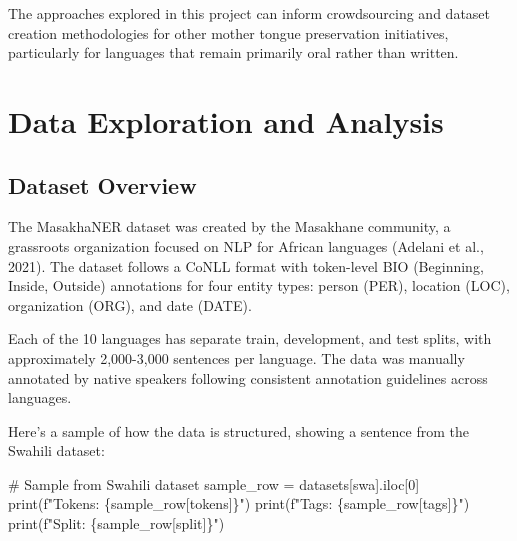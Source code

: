 \documentclass[
]{article}
\newenvironment{Shaded}{\begin{snugshade}}{\end{snugshade}}
\newcommand{\BuiltInTok}[1]{\textcolor[rgb]{0.00,0.23,0.31}{#1}}
\newcommand{\CommentTok}[1]{\textcolor[rgb]{0.37,0.37,0.37}{#1}}
\newcommand{\DecValTok}[1]{\textcolor[rgb]{0.68,0.00,0.00}{#1}}
\newcommand{\NormalTok}[1]{\textcolor[rgb]{0.00,0.23,0.31}{#1}}
\newcommand{\OperatorTok}[1]{\textcolor[rgb]{0.37,0.37,0.37}{#1}}
\newcommand{\SpecialCharTok}[1]{\textcolor[rgb]{0.37,0.37,0.37}{#1}}
\newcommand{\SpecialStringTok}[1]{\textcolor[rgb]{0.13,0.47,0.30}{#1}}
\newcommand{\StringTok}[1]{\textcolor[rgb]{0.13,0.47,0.30}{#1}}
\begin{document}
The approaches explored in this project can inform crowdsourcing and
dataset creation methodologies for other mother tongue preservation
initiatives, particularly for languages that remain primarily oral
rather than written.

\section{Data Exploration and
Analysis}\label{data-exploration-and-analysis}

\subsection{Dataset Overview}\label{dataset-overview}

The MasakhaNER dataset was created by the Masakhane community, a
grassroots organization focused on NLP for African languages (Adelani et
al., 2021). The dataset follows a CoNLL format with token-level BIO
(Beginning, Inside, Outside) annotations for four entity types: person
(PER), location (LOC), organization (ORG), and date (DATE).

Each of the 10 languages has separate train, development, and test
splits, with approximately 2,000-3,000 sentences per language. The data
was manually annotated by native speakers following consistent
annotation guidelines across languages.

Here's a sample of how the data is structured, showing a sentence from
the Swahili dataset:

\begin{Shaded}
\begin{Highlighting}[]
\CommentTok{\# Sample from Swahili dataset}
\NormalTok{sample\_row }\OperatorTok{=}\NormalTok{ datasets[}\StringTok{\textquotesingle{}swa\textquotesingle{}}\NormalTok{].iloc[}\DecValTok{0}\NormalTok{]}
\BuiltInTok{print}\NormalTok{(}\SpecialStringTok{f"Tokens: }\SpecialCharTok{\{}\NormalTok{sample\_row[}\StringTok{\textquotesingle{}tokens\textquotesingle{}}\NormalTok{]}\SpecialCharTok{\}}\SpecialStringTok{"}\NormalTok{)}
\BuiltInTok{print}\NormalTok{(}\SpecialStringTok{f"Tags: }\SpecialCharTok{\{}\NormalTok{sample\_row[}\StringTok{\textquotesingle{}tags\textquotesingle{}}\NormalTok{]}\SpecialCharTok{\}}\SpecialStringTok{"}\NormalTok{)}
\BuiltInTok{print}\NormalTok{(}\SpecialStringTok{f"Split: }\SpecialCharTok{\{}\NormalTok{sample\_row[}\StringTok{\textquotesingle{}split\textquotesingle{}}\NormalTok{]}\SpecialCharTok{\}}\SpecialStringTok{"}\NormalTok{)}
\end{Highlighting}
\end{Shaded}
\end{document}
